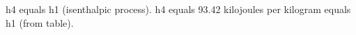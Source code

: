 h4 equals h1 (isenthalpic process).  
h4 equals 93.42 kilojoules per kilogram equals h1 (from table).
